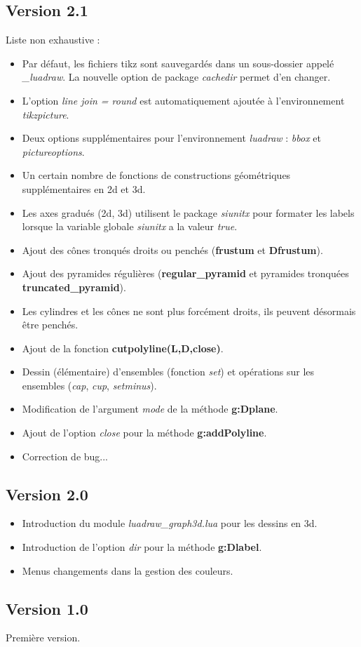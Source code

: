 \subsection{Version 2.1}
Liste non exhaustive :
\begin{itemize}
    \item Par défaut, les fichiers tikz sont sauvegardés dans un sous-dossier appelé \emph{\_luadraw}. La nouvelle option de package \emph{cachedir} permet d'en changer.
    \item L'option \emph{line join = round} est automatiquement ajoutée à l'environnement \emph{tikzpicture}.
    \item Deux options supplémentaires pour l'environnement \emph{luadraw} : \emph{bbox} et \emph{pictureoptions}.
    \item Un certain nombre de fonctions de constructions géométriques supplémentaires en 2d et 3d.
    \item Les axes gradués (2d, 3d) utilisent le package \emph{siunitx}  pour formater les labels lorsque la variable globale \emph{siunitx} a la valeur \emph{true}.
    \item Ajout des cônes tronqués droits ou penchés (\textbf{frustum} et \textbf{Dfrustum}).
    \item Ajout des pyramides régulières (\textbf{regular\_pyramid} et pyramides tronquées \textbf{truncated\_pyramid}).
    \item Les cylindres et les cônes ne sont plus forcément droits, ils peuvent désormais être penchés.
    \item Ajout de la fonction \textbf{cutpolyline(L,D,close)}.    
    \item Dessin (élémentaire) d'ensembles (fonction \emph{set}) et opérations sur les ensembles (\emph{cap}, \emph{cup}, \emph{setminus}).
    \item Modification de l'argument \emph{mode} de la méthode \textbf{g:Dplane}.
    \item Ajout de l'option \emph{close} pour la méthode \textbf{g:addPolyline}.
    \item Correction de bug...
\end{itemize}

\subsection{Version 2.0}

\begin{itemize}
    \item Introduction du module \emph{luadraw\_graph3d.lua} pour les dessins en 3d.
    \item Introduction de l'option \emph{dir} pour la méthode \textbf{g:Dlabel}.
    \item Menus changements dans la gestion des couleurs.
\end{itemize}

\subsection{Version 1.0}
Première version.
